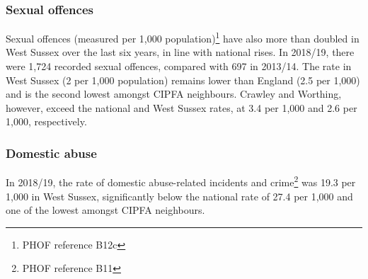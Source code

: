 


\subsubsection{Sexual offences} Sexual offences (measured per 1,000 population)\footnote{PHOF reference B12c} have also more than doubled in West Sussex over the last six years, in line with national rises. In 2018/19, there were 1,724 recorded sexual offences, compared with 697 in 2013/14. The rate in West Sussex (2 per 1,000 population) remains lower than England (2.5 per 1,000) and is the second lowest amongst CIPFA neighbours. Crawley and Worthing, however, exceed the national and West Sussex rates, at 3.4 per 1,000 and 2.6 per 1,000, respectively.



\subsubsection{Domestic abuse} In 2018/19, the rate of domestic abuse-related incidents and crime\footnote{PHOF reference B11} was 19.3 per 1,000 in West Sussex, significantly below the national rate of 27.4 per 1,000 and one of the lowest amongst CIPFA neighbours.

